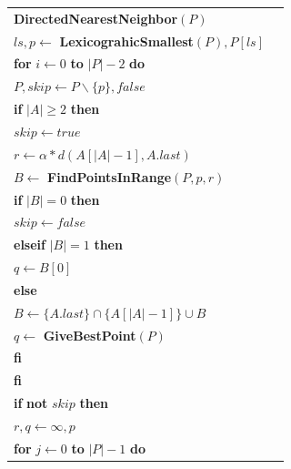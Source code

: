       \begin{figure}
        
        \begin{tabular}{lr}
       \textbf{DirectedNearestNeighbor}$(P)$                                & \\
        $ls,p \gets $ \textbf{LexicograhicSmallest}$(P),P[ls]$              & \\
        \textbf{for} $i \gets 0$ \textbf{to} $|P| - 2$ \textbf{do}          & \\
        \qquad $P,skip \gets P \backslash \{ p\},false$                     & \\
        \qquad \textbf{if} $|A| \geq 2$ \textbf{then}                       & \\
        \qquad \qquad $skip \gets true$                                     & \\
        \qquad \qquad $r \gets \alpha * d(A[|A|-1],A.last) $                & \\
        \qquad \qquad $B \gets $ \textbf{FindPointsInRange}$(P,p,r)$        & \\
        \qquad \qquad \textbf{if} $|B| = 0$ \textbf{then}                   & \\
        \qquad \qquad \qquad $skip \gets false$                             & \\
        \qquad \qquad \textbf{elseif} $|B| = 1$ \textbf{then}               & \\
        \qquad \qquad \qquad $q \gets B[0]$                                 & \\
        \qquad \qquad \textbf{else}                                         &\\
        \qquad \qquad \qquad $B \gets \{A.last\} \cap \{A[|A|-1]\} \cup B$  & \\
        \qquad \qquad \qquad $q \gets$ \textbf{GiveBestPoint}$(P)$          &  \\
        \qquad \qquad \textbf{fi}                                           & \\
        \qquad \textbf{fi}                                                  & \\
        \qquad \textbf{if} \textbf{not} $skip$ \textbf{then}                & \\
        \qquad \qquad $r,q \gets \infty,p$                                  & \\
        \qquad \qquad \textbf{for} $j \gets 0$ \textbf{to} $|P| - 1$ \textbf{do}  & \\

\end{tabular}
\end{figure}
